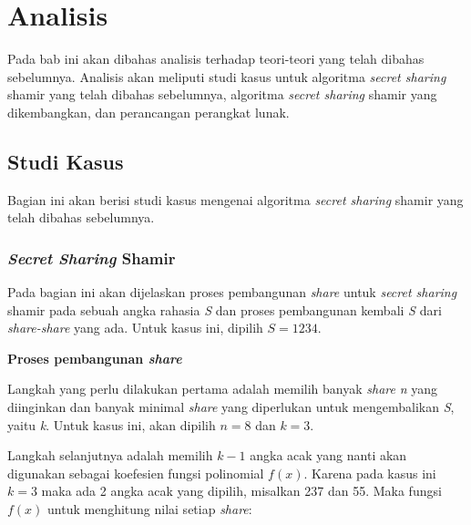 \chapter{Analisis}
\label{chap:analisis}

Pada bab ini akan dibahas analisis terhadap teori-teori yang telah dibahas sebelumnya. Analisis akan meliputi studi kasus untuk algoritma \textit{secret sharing} shamir yang telah dibahas sebelumnya, algoritma \textit{secret sharing} shamir yang dikembangkan, dan perancangan perangkat lunak.

\section{Studi Kasus}

Bagian ini akan berisi studi kasus mengenai algoritma \textit{secret sharing} shamir yang telah dibahas sebelumnya.

\subsection{\textit{Secret Sharing} Shamir}
Pada bagian ini akan dijelaskan proses pembangunan \textit{share} untuk \textit{secret sharing} shamir pada sebuah angka rahasia \textit{S} dan proses pembangunan kembali \textit{S} dari \textit{share-share} yang ada. Untuk kasus ini, dipilih \begin{math}S=1234\end{math}.

\begin{flushleft}
	\textbf{Proses pembangunan \textit{share}}
\end{flushleft}

Langkah yang perlu dilakukan pertama adalah memilih banyak \textit{share} \textit{n} yang diinginkan dan banyak minimal \textit{share} yang diperlukan untuk mengembalikan \textit{S}, yaitu \textit{k}. Untuk kasus ini, akan dipilih \begin{math}n=8\end{math} dan \begin{math}k=3\end{math}.

Langkah selanjutnya adalah memilih \begin{math}k-1\end{math} angka acak yang nanti akan digunakan sebagai koefesien fungsi polinomial \begin{math}f(x)\end{math}. Karena pada kasus ini \begin{math}k=3\end{math} maka ada 2 angka acak yang dipilih, misalkan 237 dan 55. Maka fungsi \begin{math}f(x)\end{math} untuk menghitung nilai setiap \textit{share}:

